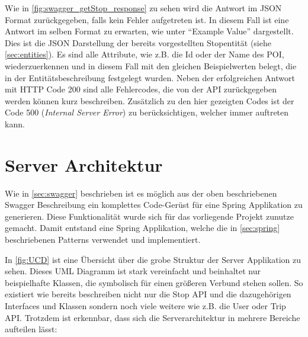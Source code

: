 \begin{itemize}
	Wie in \autoref{fig:swagger_getStop_response} zu sehen wird die Antwort im JSON Format zurückgegeben, falls kein Fehler aufgetreten ist. In diesem Fall ist eine Antwort im selben Format zu erwarten, wie unter \enquote{Example Value} dargestellt. Dies ist die JSON Darstellung der bereits vorgestellten Stopentität (siehe \autoref{sec:entities}). Es sind alle Attribute, wie z.B. die Id oder der Name des POI, wiederzuerkennen und in diesem Fall mit den gleichen Beispielwerten belegt, die in der Entitätsbeschreibung festgelegt wurden. Neben der erfolgreichen Antwort mit HTTP Code 200 sind alle Fehlercodes, die von der API zurückgegeben werden können kurz beschreiben. Zusätzlich zu den hier gezeigten Codes ist der Code 500 (\textit{Internal Server Error}) zu berücksichtigen, welcher immer auftreten kann.
	
	\newpage
	
	\end{itemize}
		
	\section{Server Architektur}
	
	Wie in \autoref{sec:swagger} beschrieben ist es möglich aus der oben beschriebenen Swagger Beschreibung ein komplettes Code-Gerüst für eine Spring Applikation zu generieren. Diese Funktionalität wurde sich für das vorliegende Projekt zunutze gemacht. Damit entstand eine Spring Applikation, welche die in \autoref{sec:spring} beschriebenen Patterns verwendet und implementiert.
	
	\vspace{0.25cm}
	
	In \autoref{fig:UCD} ist eine Übersicht über die grobe Struktur der Server Applikation zu sehen. Dieses UML Diagramm ist stark vereinfacht und beinhaltet nur beispielhafte Klassen, die symbolisch für einen größeren Verbund stehen sollen. So existiert wie bereits beschreiben nicht nur die Stop API und die dazugehörigen Interfaces und Klassen sondern noch viele weitere wie z.B. die User oder Trip API. Trotzdem ist erkennbar, dass sich die Serverarchitektur in mehrere Bereiche aufteilen lässt:
	
